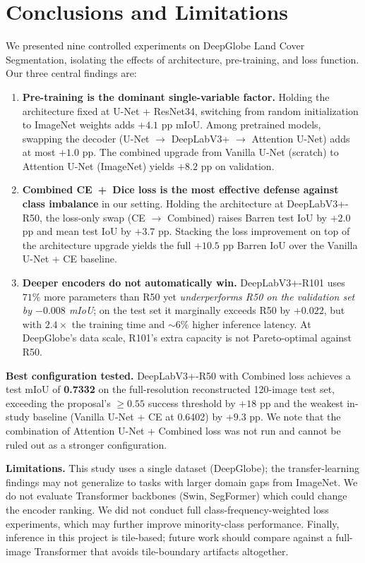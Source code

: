 \documentclass[conference,letterpaper,10pt]{IEEEtran}
\begin{document}
\section{Conclusions and Limitations}\label{sec:conclusion}

We presented nine controlled experiments on DeepGlobe Land Cover
Segmentation, isolating the effects of architecture, pre-training, and
loss function. Our three central findings are:

\begin{enumerate}
\item \textbf{Pre-training is the dominant single-variable factor.}
      Holding the architecture fixed at U-Net + ResNet34, switching from
      random initialization to ImageNet weights adds $+4.1$ pp mIoU.
      Among pretrained models, swapping the decoder
      (U-Net $\to$ DeepLabV3+ $\to$ Attention U-Net) adds at most
      $+1.0$ pp. The combined upgrade from Vanilla U-Net (scratch) to
      Attention U-Net (ImageNet) yields $+8.2$ pp on validation.
\item \textbf{Combined CE~+~Dice loss is the most effective defense
      against class imbalance} in our setting. Holding the architecture
      at DeepLabV3+-R50, the loss-only swap (CE $\to$ Combined) raises
      Barren test IoU by $+2.0$ pp and mean test IoU by $+3.7$ pp.
      Stacking the loss improvement on top of the architecture upgrade
      yields the full $+10.5$ pp Barren IoU over the Vanilla U-Net + CE
      baseline.
\item \textbf{Deeper encoders do not automatically win.}
      DeepLabV3+-R101 uses $71\%$ more parameters than R50 yet
      \emph{underperforms R50 on the validation set by $-0.008$ mIoU};
      on the test set it marginally exceeds R50 by $+0.022$, but with
      $2.4\times$ the training time and $\sim 6\%$ higher inference
      latency. At DeepGlobe's data scale, R101's extra capacity is not
      Pareto-optimal against R50.
\end{enumerate}

\textbf{Best configuration tested.} DeepLabV3+-R50 with Combined loss
achieves a test mIoU of \textbf{0.7332} on the full-resolution
reconstructed 120-image test set, exceeding the proposal's $\ge 0.55$
success threshold by $+18$ pp and the weakest in-study baseline
(Vanilla U-Net + CE at 0.6402) by $+9.3$ pp. We note that the combination
of Attention U-Net + Combined loss was not run and cannot be ruled out
as a stronger configuration.

\textbf{Limitations.} This study uses a single dataset (DeepGlobe); the
transfer-learning findings may not generalize to tasks with larger
domain gaps from ImageNet. We do not evaluate Transformer backbones
(Swin, SegFormer) which could change the encoder ranking. We did not
conduct full class-frequency-weighted loss experiments, which may
further improve minority-class performance. Finally, inference in this
project is tile-based; future work should compare against a full-image
Transformer that avoids tile-boundary artifacts altogether.
\end{document}
